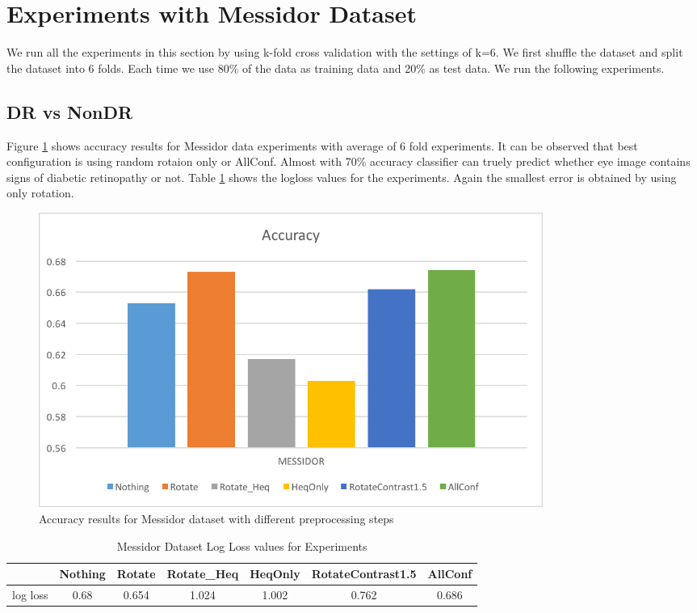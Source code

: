 \section{Experiments with Messidor Dataset}
We run all the experiments in this section by using k-fold cross validation with the settings of k=6. We first shuffle the dataset and split the dataset into 6 folds. Each time we use 80\% of the data as training data and 20\% as test data. We run the following experiments.

\subsection{DR vs NonDR}
Figure \ref{messidoracc} shows accuracy results for Messidor data experiments with average of 6 fold experiments. It can be observed that best configuration is using random rotaion only or AllConf. Almost with 70\% accuracy classifier can truely predict whether eye image contains signs of diabetic retinopathy or not. Table \ref{tab:msdll} shows the logloss values for the experiments. Again the smallest error is obtained by using only rotation.

\begin{figure}[!htbbp]
\centering
\includegraphics[width=0.8\textwidth]{Figures/messidor.png}
\caption{Accuracy results for Messidor dataset with different preprocessing steps}
\label{messidoracc}
\end{figure}

\begin{table}[t]
\centering
\caption{Messidor Dataset Log Loss values for Experiments} \label{tab:msdll}
\begin{tabular}{|c|c|c|c|c|c|c|} \hline
 & Nothing & Rotate & Rotate\_Heq & HeqOnly & RotateContrast1.5 & AllConf \\ \hline
log loss & 0.68 & 0.654 & 1.024 & 1.002 & 0.762 & 0.686 \\ \hline
\end{tabular}
\end{table}


